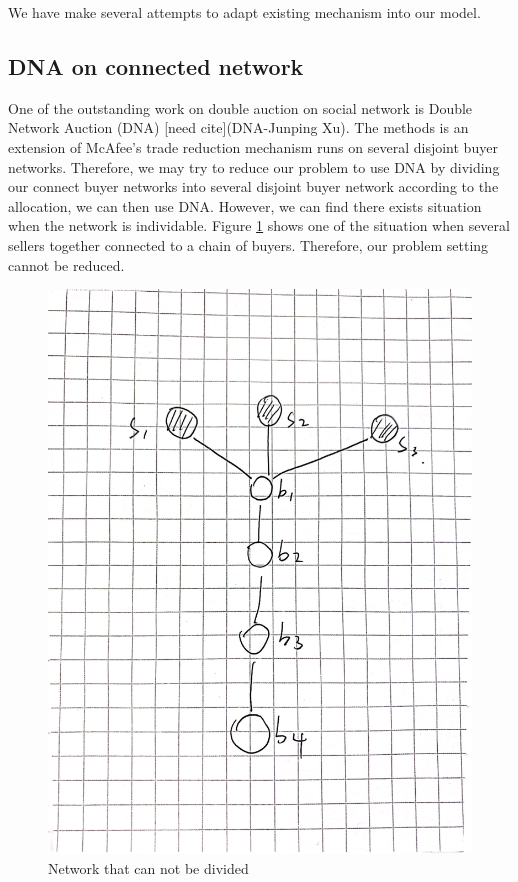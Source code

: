 We have make several attempts to adapt existing mechanism into our model.
\subsection{DNA on connected network}
One of the outstanding work on double auction on social network is Double Network Auction (DNA)
[need cite](DNA-Junping Xu). The methods is an extension of McAfee's trade reduction mechanism
runs on several disjoint buyer networks. Therefore, we may try to reduce our problem to use DNA
by dividing our connect buyer networks into several disjoint buyer network according to the allocation, we can then use DNA. However, we can find there exists situation when the network is individable. Figure \ref*{fig:DNACounter}
shows one of the situation when several sellers together connected to a chain of buyers. Therefore,
our problem setting cannot be reduced.
\begin{figure}[htbp]
  \includegraphics[scale = 0.05]{./figure/DNA_counter_1.jpg}
  \caption{Network that can not be divided}
  \label{fig:DNACounter}
\end{figure}
